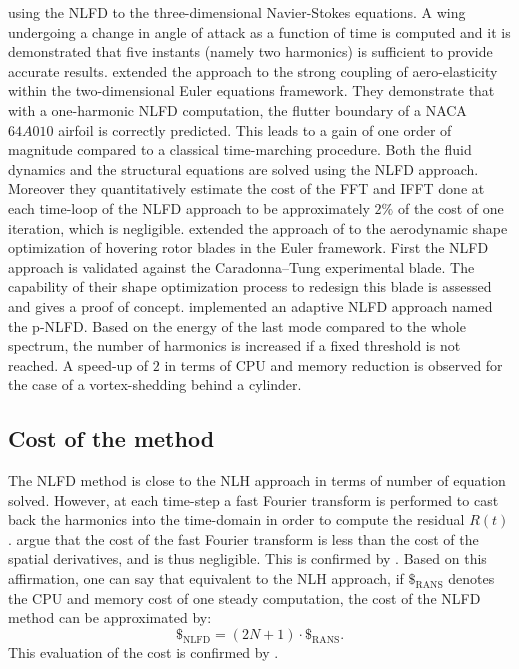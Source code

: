 using the NLFD to the three-dimensional Navier-Stokes equations.
A wing undergoing a change 
in angle of attack as a function of time is computed and
it is demonstrated that
five instants (namely two harmonics) is sufficient to provide
accurate results.
\citet{Kachra2008} extended the approach to the strong coupling of
aero-elasticity within the two-dimensional Euler equations framework.
They demonstrate that with a one-harmonic NLFD computation, the
flutter boundary of a NACA$64A010$ airfoil is correctly predicted.
This leads to a gain of one order of magnitude compared to a classical
time-marching procedure. Both the fluid dynamics and the structural equations
are solved using the NLFD approach. Moreover they quantitatively estimate the
cost of the FFT and IFFT done at each time-loop of the NLFD approach to be
approximately $2\%$ of the cost of one iteration, which is negligible.
\citet{Tatossian2011} extended the approach of \citet{Nadarajah2007}
to the aerodynamic shape optimization of hovering rotor blades
in the Euler framework.
First the NLFD approach is validated
against the Caradonna–Tung experimental blade.
The capability of 
their shape optimization process
to redesign this blade is assessed and gives a proof
of concept.
\citet{Mosahebi2013} implemented an adaptive NLFD approach named
the p-NLFD. Based on the energy of the last mode compared
to the whole spectrum, the number of harmonics
is increased if a fixed threshold is not reached.
A speed-up of $2$ in terms of CPU and
memory reduction is observed for the case of a
vortex-shedding behind a cylinder.




\subsection{Cost of the method}
The NLFD method is close to the NLH approach in terms of number
of equation solved. However, at each time-step a fast Fourier transform
is performed to cast back the harmonics into the time-domain in order
to compute the residual $R(t)$. \citet{McMullen2006} argue
that the cost of the fast Fourier transform is less than the cost of 
the spatial derivatives, and is thus negligible. This is 
confirmed by \citet{Kachra2008}.
Based on this affirmation, one can say that equivalent to the NLH
approach, if $\mathdollar_{\text{RANS}}$ 
denotes the CPU and memory cost of
one steady computation, the cost of the NLFD method can be 
approximated by:
\begin{equation}
	\mathdollar_{\text{NLFD}} = (2N+1) \cdot \mathdollar_{\text{RANS}}.
\end{equation}
This evaluation of the cost is confirmed by \citet{McMullen2002}.